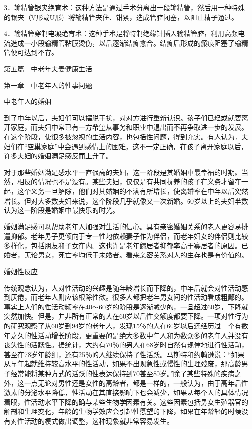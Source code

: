 \documentclass[12pt,UTF8]{ctexbook}
\begin{document}
3．输精管银夹绝育术：这种方法是通过手术分离出一段输精管，然后用一种特殊的银夹（V形或U形）将输精管夹住、钳紧，造成管腔闭塞，以阻止精子通过。

4．输精管穿制电凝绝育术：这种手术是将特制绝缘针插入输精管腔，利用高频电流造成一小段输精管粘膜烫伤，以后逐渐结痂愈合。结痂后形成的瘢痕阻塞了输精管便可达到不育。





第五篇　中老年夫妻健康生活





第一章　中老年人的性事问题


中老年人的婚姻


到了中年以后，夫妇们可以摆脱干扰，对对方进行重新认识。孩子们已经或就要离开家庭，而夫妇中常已有一方希望从事务和职业中退出而不再争取进一步的发展。在这个阶段，使很多被忽视的生活内容，也包括性问题，得到充实。有人认为，夫妇们在“空巢家庭”中会遇到感情上的困难，这不一定正确，在孩子离开家庭以后，许多夫妇的婚姻满足感反而上升了。

对于那些婚姻满足感水平一直很高的夫妇，这一阶段是其婚姻中最幸福的时期。当然，相反的情况也不是没有。某些夫妇，仅仅是有共同抚养的孩子在义务才留在一起，这个义务一旦解除，他们对其婚姻的不满有所增长，使离婚率在中年以后突然增长。但对大多数夫妇来说，这个阶段几乎就像又一次新婚。60岁以上的夫妇半数认为这一阶段是婚姻中最快乐的时光。

婚姻满足感可以帮助老年人加强对生活的信心。具有亲密婚姻关系的老人更容易排遣抑郁。老年男子更倾向于专一性地依赖妻子作为伴侣，而老年妇女的伴侣则比较多样化，包括朋友和子女在内。这也许是老年鳏居者抑郁率高于寡居者的原因。已婚者，无论男女，死亡率均低于未婚者。看来亲密关系对人的生存也是有价值的。





婚姻性反应


传统观念认为，人对性活动的兴趣是随年龄增长而下降的，中年后就会对性活动感到厌倦，而老年人则应该根除性欲。很多人都把老年男女间的性活动看成粗鄙的。事实上人们的性活动频率在40～60岁的阶段是逐渐减少的，一旦超过60岁，下降就突然加快。但是，并非所有正常的人在60岁以后性交额度都要下降。一项对性行为的研究观察了从60岁到94岁的老年人，发现15％的人在60岁以后还经历过一个有数年之久的性活动增长阶段。更重要的是绝大多数中年人和为数众多的老年人并没有丧失性的活跃性。据统计，大约有70％的男人在68岁时自然有规律地进行性活动，甚至在78岁年龄组，还有25％的人继续保持了性活跃。马斯特和约翰逊说：“如果从早年起就维持较高水平的性活动，如果不出现急性或慢性的生理残废，那高龄男子经常能将某种方式的活跃的性表达保持到70甚至80岁。”除了某些特殊的疾病之外，这一点无论对男性还是女性的高龄者，都是一样的，一般认为，由于高年后性激素的分泌水平降低，性活动在其直接影响下也会减少，如果从每个人的具体情况着眼，性活动水平下降的确与某些生物学因素有关。这些因素包括男女生殖器官的解剖和生理变化，年龄的生物学效应会引起性愿望的下降，如果在年龄轻的时候没有对性活动的模式做出调整，这种现象就非常容易发生。
\end{document}
